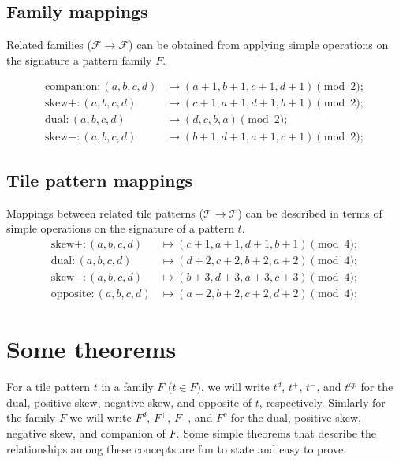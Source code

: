 \documentclass{tufte-book}
\begin{document}
\subsection{Family mappings}
Related families ($\mathcal{F}\longrightarrow\mathcal{F}$) can be obtained from applying simple operations on the signature a pattern family $F$.

\begin{align*}        
\text{companion}: (a,b,c,d) &\mapsto (a+1, b+1, c+ 1, d+1) \pmod{2};\\
    \text{skew}+ : (a,b,c,d) &\mapsto (c+1, a+1, d+ 1, b+1) \pmod{2};\\
    \text{dual} : (a,b,c,d) &\mapsto (d, c, b, a) \pmod{2};\\
    \text{skew}- : (a,b,c,d) &\mapsto (b+1, d+1, a+ 1, c+1) \pmod{2};
\end{align*}

\subsection{Tile pattern mappings}
Mappings between related tile patterns ($\mathcal{T}\longrightarrow\mathcal{T}$) can be described in terms of simple operations on the signature of a pattern $t$.
\marginnote{\centering}
\begin{align*}        
    \text{skew}+ : (a,b,c,d) &\mapsto (c+1, a+1, d+ 1, b+1) \pmod{4};\\
    \text{dual} : (a,b,c,d) &\mapsto (d+2, c+2, b+ 2, a+2) \pmod{4};\\
    \text{skew}- : (a,b,c,d) &\mapsto (b+3, d+3, a+ 3, c+3) \pmod{4};\\
    \text{opposite} : (a,b,c,d) &\mapsto (a+2, b+2, c+2, d+2) \pmod{4};
\end{align*}

\section{Some theorems}

\noindent
For a tile pattern $t$ in a family $F$ ($t\in F$), we will write $t^d$, $t^+$, $t^-$, and  $t^{op}$ for the dual, positive skew, negative skew, and opposite of $t$, respectively. Simlarly for the family $F$ we will write $F^d$, $F^+$, $F^-$, and  $F^{c}$ for the dual, positive skew, negative skew, and companion of $F$. Some simple theorems that describe the relationships among these concepts are fun to state and easy to prove.
\end{document}
